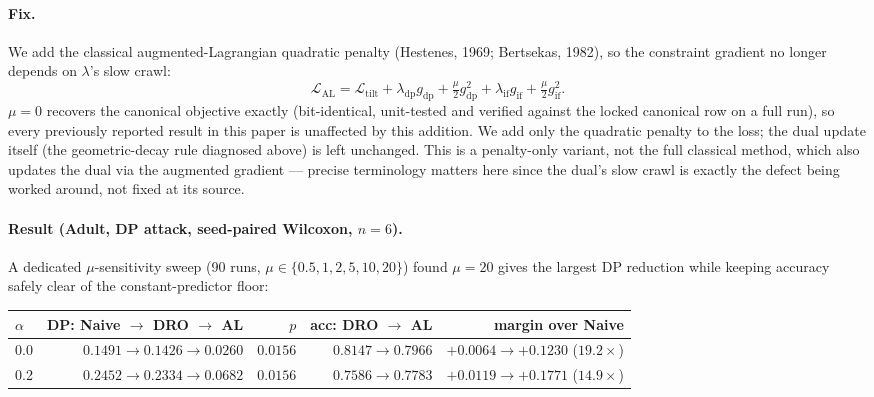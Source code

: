 \paragraph{Fix.} We add the classical augmented-Lagrangian quadratic penalty
(Hestenes, 1969; Bertsekas, 1982), so the constraint gradient no longer
depends on $\lambda$'s slow crawl:
\begin{equation}
\mathcal{L}_{\mathrm{AL}} = \mathcal{L}_{\mathrm{tilt}}
+ \lambda_{\mathrm{dp}} g_{\mathrm{dp}} + \tfrac{\mu}{2} g_{\mathrm{dp}}^2
+ \lambda_{\mathrm{if}} g_{\mathrm{if}} + \tfrac{\mu}{2} g_{\mathrm{if}}^2 .
\end{equation}
$\mu{=}0$ recovers the canonical objective exactly (bit-identical, unit-tested
and verified against the locked canonical row on a full run), so every
previously reported result in this paper is unaffected by this addition. We
add only the quadratic penalty to the loss; the dual update itself (the
geometric-decay rule diagnosed above) is left unchanged. This is a
penalty-only variant, not the full classical method, which also updates the
dual via the augmented gradient --- precise terminology matters here since
the dual's slow crawl is exactly the defect being worked around, not fixed
at its source.

\paragraph{Result (Adult, DP attack, seed-paired Wilcoxon, $n{=}6$).}
A dedicated $\mu$-sensitivity sweep (90 runs, $\mu\in\{0.5,1,2,5,10,20\}$)
found $\mu{=}20$ gives the largest DP reduction while keeping accuracy safely
clear of the constant-predictor floor:

\begin{center}
\begin{tabular}{lrrrr}
\toprule
$\alpha$ & DP: Naive $\to$ DRO $\to$ AL & $p$ & acc: DRO $\to$ AL & margin over Naive \\
\midrule
0.0 & $0.1491\to0.1426\to\mathbf{0.0260}$ & $0.0156$ & $0.8147\to0.7966$ & $+0.0064\to\mathbf{+0.1230}$ ($19.2\times$) \\
0.2 & $0.2452\to0.2334\to\mathbf{0.0682}$ & $0.0156$ & $0.7586\to0.7783$ & $+0.0119\to\mathbf{+0.1771}$ ($14.9\times$) \\
\bottomrule
\end{tabular}
\end{center}


